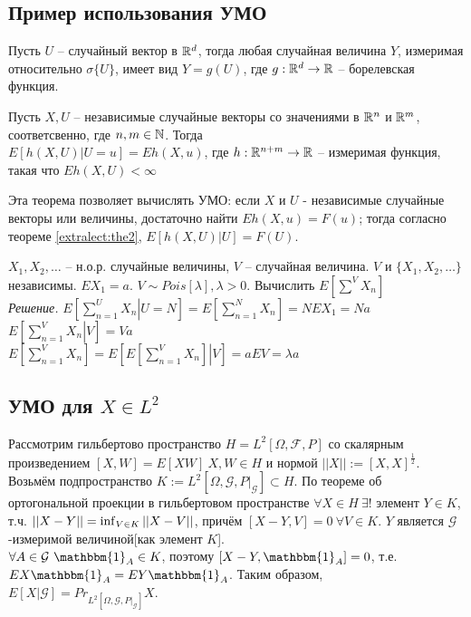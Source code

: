         \subsection{Пример использования УМО}

        \begin{lemma}
            Пусть $U$ -- случайный вектор в $\mathbb{R}^d$, тогда любая случайная величина $Y$, измеримая относительно $\sigma\{U\}$, имеет вид ${Y=g(U)}$, 
            где ${g: \mathbb{R}^d \to \mathbb{R}}$ -- борелевская функция. 
        \end{lemma}

        \begin{theorem}\label{extralect:the2}
            Пусть $X, U$ -- независимые случайные векторы со значениями в $\mathbb{R}^n$ и $\mathbb{R}^m$, соответсвенно, где $n, m \in \mathbb{N}$. Тогда\\
            $E[h(X,U)|U=u]=Eh(X,u)$, где $h: \mathbb{R}^{n+m} \to \mathbb{R}$ -- измеримая функция, такая что $Eh(X,U) < \infty$
        \end{theorem}
        Эта теорема позволяет вычислять УМО: если $X$ и $U$ - независимые случайные векторы или величины, достаточно найти $Eh(X, u) = F(u)$; тогда 
        согласно теореме \ref{extralect:the2}, $E[h(X, U)|U] = F(U)$.

        \begin{example}
            $X_1, X_2, \ldots$ -- н.о.р. случайные величины, $V$ -- случайная величина. $V$ и $\{X_1, X_2, \ldots\}$ независимы. 
            $EX_1=a$. $V\sim Pois[\lambda], \lambda > 0$. Вычислить $E[\sum\limits^{V} X_n]$ \\
            \textit{Решение.} $E\left[\left.\sum\limits_{n=1}^{U} X_n\right|U=N\right]=E\left[\sum\limits_{n=1}^{N} X_n\right]=N EX_1=Na$\\
            $E\left[\left. \sum\limits_{n=1}^{V} X_n \right|V\right] = Va$ \\
            $E\left[\sum\limits_{n=1}^{V} X_n\right] = E\left[E\left[\left.\sum\limits_{n=1}^{V} X_n\right]\right|V\right] = aEV = \lambda a$
        \end{example}

        
        \subsection{УМО для $X \in L^2$} 
        Рассмотрим гильбертово пространство $H=L^2[\Omega, \mathcal{F}, P]$ со скалярным произведением $[X, W]=E[XW] \ X, W \in H$ и нормой 
        $||X||:=[X,X]^\frac{1}{2}$. Возьмём подпространство $K:=L^2[\Omega, \mathcal{G}, P|_\mathcal{G}] \subset H$. По теореме об ортогональной проекции 
        в гильбертовом пространстве $\forall X \in H \ \exists !$ элемент $Y \in K$, т.ч. $||X-Y|| = \inf_{V\in K} \text ||X- V||$, причём
        $[X-Y, V]=0 \ \forall V\in K$. $Y$ является $\mathcal{G}$-измеримой величиной[как элемент $K$]. \\ $\forall A \in \mathcal{G} \ \mathbbm{1}_{A}\in K$, поэтому
        $[X-Y, \mathbbm{1}_{A}]=0$, т.е. $EX\mathbbm{1}_{A}=EY\mathbbm{1}_{A}$. Таким образом, $E[X|\mathcal{G}]=Pr_{L^2[\Omega, \mathcal{G}, P|_\mathcal{G}]}X$.

